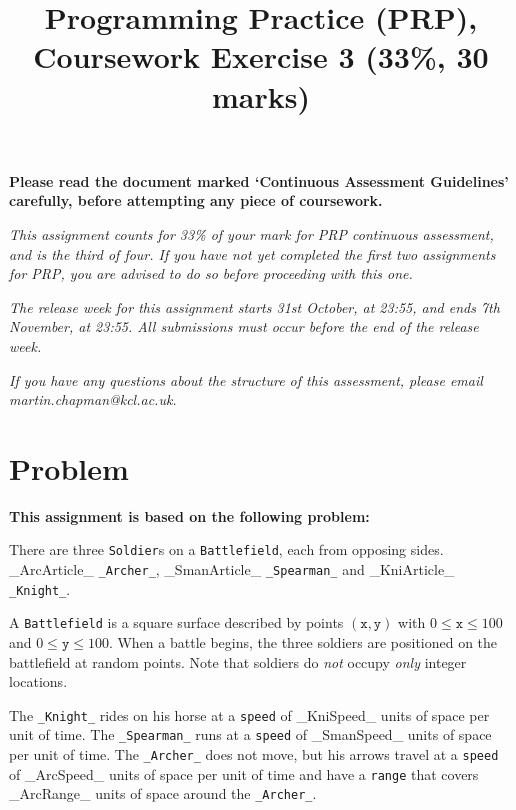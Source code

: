 \documentclass[11pt]{article}
\title{Programming Practice (PRP), Coursework Exercise 3 (33\%, 30 marks)}
\date{}                                           %
\begin{document}
\maketitle

\textbf{Please read the document marked `Continuous Assessment Guidelines' carefully, before attempting any piece of coursework.}

\emph{This assignment counts for 33\% of your mark for PRP continuous assessment, and is the third of four. If you have not yet completed the first two assignments for PRP, you are advised to do so before proceeding with this one.}

\emph{The release week for this assignment starts 31st October, at 23:55, and ends 7th November, at 23:55. All submissions must occur before the end of the release week.}

\emph{If you have any questions about the structure of this assessment, please email \\ martin.chapman@kcl.ac.uk.}

\section{Problem}

\textbf{This assignment is based on the following problem:}

There are three \texttt{Soldier}s on a \texttt{Battlefield}, each from opposing sides. _ArcArticle_ \texttt{_Archer_}, _SmanArticle_ \texttt{_Spearman_} and _KniArticle_ \texttt{_Knight_}. 

A \texttt{Battlefield} is a square surface described by points $(\texttt{x}, \texttt{y})$ with $0 \leq \texttt{x} \leq 100$ and $0 \leq \texttt{y} \leq 100$. When a battle begins, the three soldiers are positioned on the battlefield at random points. Note that soldiers do \emph{not} occupy \emph{only} integer locations.

The \texttt{_Knight_} rides on his horse at a \texttt{speed} of _KniSpeed_ units of space per unit of time. The \texttt{_Spearman_} runs at a \texttt{speed} of _SmanSpeed_ units of space per unit of time. The \texttt{_Archer_} does not move, but his arrows travel at a \texttt{speed} of _ArcSpeed_ units of space per unit of time and have a \texttt{range} that covers _ArcRange_ units of space around the \texttt{_Archer_}.
\end{document}
